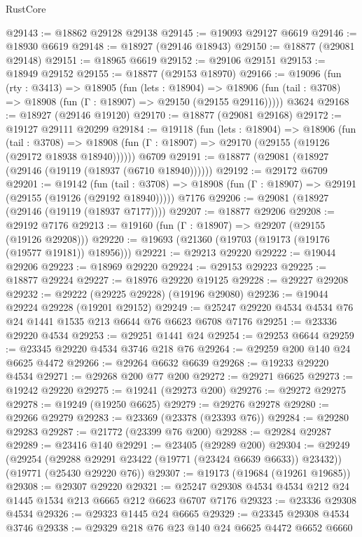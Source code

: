 \begin{lexlean}{RustCore}
\begin{coremodule}
@29143 := @18862 @29128 @29138
@29145 := @19093 @29127 @6619
@29146 := @18930 @6619
@29148 := @18927 (@29146 @18943)
@29150 := @18877 (@29081 @29148)
@29151 := @18965 @6619
@29152 := @29106 @29151
@29153 := @18949 @29152
@29155 := @18877 (@29153 @18970)
@29166 := @19096
    (fun (rty : @3413) =>
    @18905
      (fun (lets : @18904) =>
      @18906 (fun (tail : @3708) => @18908 (fun (Γ : @18907) => @29150 (@29155 @29116)))))
    @3624
@29168 := @18927 (@29146 @19120)
@29170 := @18877 (@29081 @29168)
@29172 := @19127 @29111 @20299
@29184 := @19118
    (fun (lets : @18904) =>
    @18906
      (fun (tail : @3708) =>
      @18908 (fun (Γ : @18907) => @29170 (@29155 (@19126 (@29172 @18938 @18940))))))
    @6709
@29191 := @18877 (@29081 (@18927 (@29146 (@19119 (@18937 (@6710 @18940))))))
@29192 := @29172 @6709
@29201 := @19142
    (fun (tail : @3708) => @18908 (fun (Γ : @18907) => @29191 (@29155 (@19126 (@29192 @18940)))))
    @7176
@29206 := @29081 (@18927 (@29146 (@19119 (@18937 @7177))))
@29207 := @18877 @29206
@29208 := @29192 @7176
@29213 := @19160 (fun (Γ : @18907) => @29207 (@29155 (@19126 @29208)))
@29220 := @19693 (@21360 (@19703 (@19173 (@19176 (@19577 @19181)) @18956)))
@29221 := @29213 @29220
@29222 := @19044 @29206
@29223 := @18969 @29220
@29224 := @29153 @29223
@29225 := @18877 @29224
@29227 := @18976 @29220 @19125
@29228 := @29227 @29208
@29232 := @29222 (@29225 @29228) (@19196 @29080)
@29236 := @19044 @29224 @29228 (@19201 @29152)
@29249 := @25247 @29220 @4534 @4534 @76 @24 @1441 @1535 @213 @6644 @76 @6623 @6708 @7176
@29251 := @23336 @29220 @4534
@29253 := @29251 @1441 @24
@29254 := @29253 @6644
@29259 := @23345 @29220 @4534 @3746 @218 @76
@29264 := @29259 @200 @140 @24 @6625 @4472
@29266 := @29264 @6632 @6639
@29268 := @19233 @29220 @4534
@29271 := @29268 @200 @77 @200
@29272 := @29271 @6625
@29273 := @19242 @29220
@29275 := @19241 (@29273 @200)
@29276 := @29272 @29275
@29278 := @19249 (@19250 @6625)
@29279 := @29276 @29278
@29280 := @29266 @29279
@29283 := @23369 (@23378 (@23393 @76))
@29284 := @29280 @29283
@29287 := @21772 (@23399 @76 @200)
@29288 := @29284 @29287
@29289 := @23416 @140
@29291 := @23405 (@29289 @200)
@29304 := @29249
    (@29254 (@29288 @29291 @23422 (@19771 (@23424 @6639 @6633)) @23432))
    (@19771 (@25430 @29220 @76))
@29307 := @19173 (@19684 (@19261 @19685))
@29308 := @29307 @29220
@29321 := @25247 @29308 @4534 @4534 @212 @24 @1445 @1534 @213 @6665 @212 @6623 @6707 @7176
@29323 := @23336 @29308 @4534
@29326 := @29323 @1445 @24 @6665
@29329 := @23345 @29308 @4534 @3746
@29338 := @29329 @218 @76 @23 @140 @24 @6625 @4472 @6652 @6660

\end{coremodule}
\end{lexlean}
